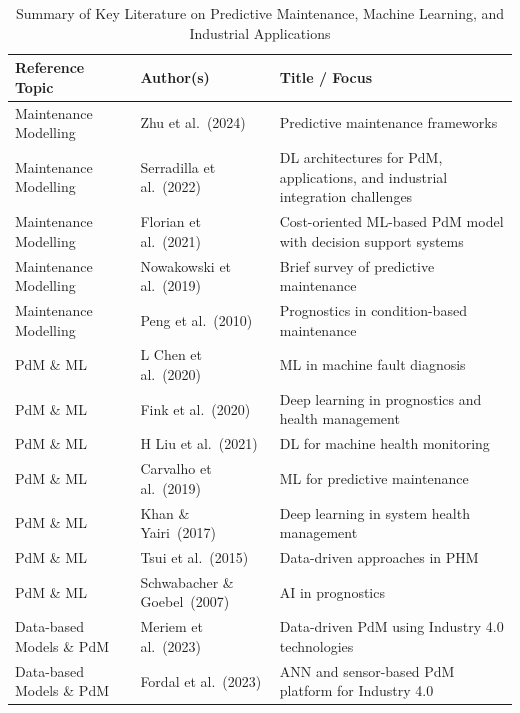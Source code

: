 \documentclass[final,5p, twocolumn]{elsarticle}
\begin{document}
\begin{table}[!htb]
\centering
\small
\caption{Summary of Key Literature on Predictive Maintenance, Machine Learning, and Industrial Applications}
\label{tab:literature_review}
\begin{tabular}{p{3cm} p{3.8cm} p{6.5cm}}
\toprule
\textbf{Reference Topic} & \textbf{Author(s)} & \textbf{Title / Focus} \\
\midrule
Maintenance Modelling & Zhu et al.~(2024) \cite{zhu2024leveraging} & Predictive maintenance frameworks \\
Maintenance Modelling & Serradilla et al.~(2022) \cite{serradilla2022deep} & DL architectures for PdM, applications, and industrial integration challenges \\
Maintenance Modelling & Florian et al.~(2021) \cite{florian2021machine} & Cost-oriented ML-based PdM model with decision support systems \\
Maintenance Modelling & Nowakowski et al.~(2019) \cite{nowakowski2019evolution} & Brief survey of predictive maintenance \\
Maintenance Modelling & Peng et al.~(2010) \cite{peng2010current} & Prognostics in condition-based maintenance \\
\midrule
PdM \& ML & L Chen et al.~(2020) \cite{chen2020mechanical} & ML in machine fault diagnosis \\
PdM \& ML & Fink et al.~(2020) \cite{fink2020potential} & Deep learning in prognostics and health management \\
PdM \& ML & H Liu et al.~(2021) \cite{liu2021lstm} & DL for machine health monitoring \\
PdM \& ML & Carvalho et al.~(2019) \cite{carvalho2019systematic} & ML for predictive maintenance \\
PdM \& ML & Khan \& Yairi~(2017) \cite{yan2017industrial} & Deep learning in system health management \\
PdM \& ML & Tsui et al.~(2015) \cite{tsui2015prognostics} & Data-driven approaches in PHM \\
PdM \& ML & Schwabacher \& Goebel~(2007) \cite{schwabacher2007survey} & AI in prognostics \\
\midrule
Data-based Models \& PdM & Meriem et al.~(2023) \cite{meriem2023predictive} & Data-driven PdM using Industry 4.0 technologies \\
Data-based Models \& PdM & Fordal et al.~(2023) \cite{fordal2023application} & ANN and sensor-based PdM platform for Industry 4.0 \\

\end{tabular}
\end{table}
\end{document}
